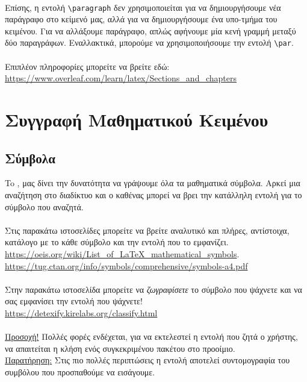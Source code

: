 \documentclass[a4paper, 12pt, oneside, xelatex, final]{article}
\begin{document}
	\\
	Επίσης, η εντολή \verb+\paragraph+ δεν χρησιμοποιείται για να δημιουργήσουμε νέα παράγραφο στο κείμενό μας, αλλά για να δημιουργήσουμε ένα υπο-τμήμα του κειμένου. Για να αλλάξουμε παράγραφο, απλώς αφήνουμε μία κενή γραμμή μεταξύ δύο παραγράφων. Εναλλακτικά, μπορούμε να χρησιμοποιήσουμε την εντολή \verb+\par+.\\
	\\
	Επιπλέον πληροφορίες μπορείτε να βρείτε εδώ:\\
	\url{https://www.overleaf.com/learn/latex/Sections_and_chapters}


\section{Συγγραφή Μαθηματικού Κειμένου}	
		\subsection{Σύμβολα}	
		\noindent To \XeLaTeX, μας δίνει την δυνατότητα να γράψουμε όλα τα μαθηματικά σύμβολα. Αρκεί μια αναζήτηση στο διαδίκτυο και ο καθένας μπορεί να βρει την κατάλληλη εντολή για το σύμβολο που αναζητά.\\ \\
		Στις παρακάτω ιστοσελίδες μπορείτε να βρείτε αναλυτικό και πλήρες, αντίστοιχα, κατάλογο με το κάθε σύμβολο και την εντολή που το εμφανίζει.\\
		\url{https://oeis.org/wiki/List_of_LaTeX_mathematical_symbols}.\\
		\url{https://tug.ctan.org/info/symbols/comprehensive/symbols-a4.pdf}\\ \\
		Στην παρακάτω ιστοσελίδα μπορείτε να \emph{ζωγραφίσετε} το σύμβολο που ψάχνετε και να σας εμφανίσει την εντολή που ψάχνετε! \\ 
		\url{https://detexify.kirelabs.org/classify.html}\\ \\
		\underline{Προσοχή!} Πολλές φορές ενδέχεται, για να εκτελεστεί η εντολή που ζητά ο χρήστης, να απαιτείται η κλήση ενός συγκεκριμένου πακέτου στο προοίμιο.\\
		\underline{Παρατήρηση:} Στις πιο πολλές περιπτώσεις η εντολή αποτελεί συντομογραφία του συμβόλου που προσπαθούμε να εισάγουμε.\\
		\vspace*{-4ex}		
\end{document}
